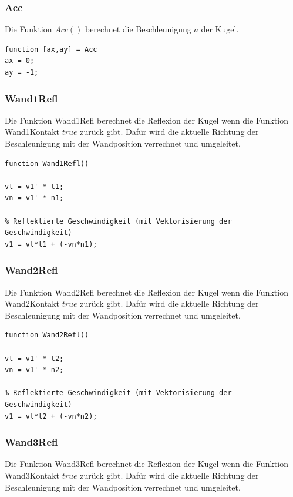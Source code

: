\documentclass[]{scrartcl}
\begin{document}
\subsubsection{Acc}

Die Funktion $Acc()$ berechnet die Beschleunigung $a$ der Kugel.


\begin{lstlisting}
function [ax,ay] = Acc
ax = 0;
ay = -1;
\end{lstlisting}

\subsubsection{Wand1Refl}

Die Funktion Wand1Refl berechnet die Reflexion der Kugel wenn die Funktion Wand1Kontakt $true$ zurück gibt. Dafür wird die aktuelle Richtung der Beschleunigung mit der Wandposition verrechnet und umgeleitet.

\begin{lstlisting}
function Wand1Refl()

vt = v1' * t1;
vn = v1' * n1;

% Reflektierte Geschwindigkeit (mit Vektorisierung der Geschwindigkeit)
v1 = vt*t1 + (-vn*n1); 
\end{lstlisting}

\subsubsection{Wand2Refl}

Die Funktion Wand2Refl berechnet die Reflexion der Kugel wenn die Funktion Wand2Kontakt $true$ zurück gibt. Dafür wird die aktuelle Richtung der Beschleunigung mit der Wandposition verrechnet und umgeleitet.

\begin{lstlisting}
function Wand2Refl()

vt = v1' * t2;
vn = v1' * n2;

% Reflektierte Geschwindigkeit (mit Vektorisierung der Geschwindigkeit)
v1 = vt*t2 + (-vn*n2); 
\end{lstlisting}

\subsubsection{Wand3Refl}

Die Funktion Wand3Refl berechnet die Reflexion der Kugel wenn die Funktion Wand3Kontakt $true$ zurück gibt. Dafür wird die aktuelle Richtung der Beschleunigung mit der Wandposition verrechnet und umgeleitet.
\end{document}
